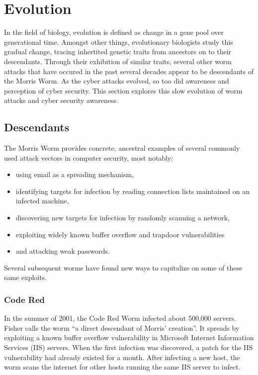 \section*{Evolution}
In the field of biology, evolution is defined as change in a gene pool over
generational time. Amongst other things, evolutionary biologists study this
gradual change, tracing inhertited genetic traits from ancestors on to
their descendants. Through their exhibition of similar traits, several
other worm attacks that have occured in the past several decades appear to be
descendants of the Morris Worm. As the cyber attacks evolved, so
too did awareness and perception of cyber security. This section explores this
slow evolution of worm attacks and cyber security awareness.

\subsection*{Descendants}
The Morris Worm provides concrete, ancestral examples of several commonly used
attack vectors in computer security, most notably:
\begin{itemize}
  \item using email as a spreading mechanism,
  \item identifying targets for infection by reading connection lists maintained
  on an infected machine,
  \item discovering new targets for infection by randomly scanning a network,
  \item exploiting widely known buffer overflow and trapdoor vulnerabilities
  \item and attacking weak passwords.
\end{itemize}
Several subsequent worms have found new ways to capitalize on some of these same
exploits.
\subsubsection*{Code Red}
In the summer of 2001, the Code Red Worm infected about 500,000 servers.
Fisher\cite{fisher_living_2002} calls
the worm ``a direct descendant of Morris' creation''.
It spreads by exploiting a known buffer overflow vulnerability in Microsoft
Internet Information Services (IIS) servers. When the first infection was
discovered, a patch for the IIS vulnerability had already existed for a
month\cite{fisher_code_2001}. After infecting a new host, the worm scans the
internet for other hosts running the same IIS server to infect. 

